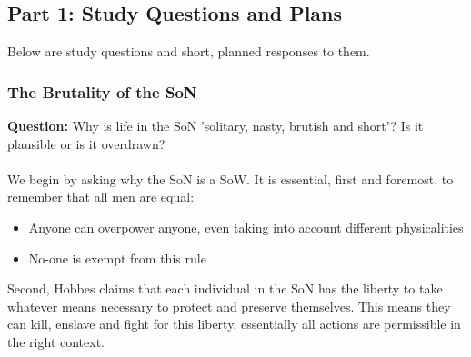 \documentclass[12pt, letterpaper]{article}
\begin{document}
\subsection{Part 1: Study Questions and Plans}
Below are study questions and short, planned responses to them.

\subsubsection{The Brutality of the SoN}
\textbf{Question:} Why is life in the SoN 'solitary, nasty, brutish and short'? Is it plausible or is it overdrawn?\\\\
We begin by asking why the SoN is a SoW. It is essential, first and foremost, to remember that all men are equal:
\begin{itemize}
	\item Anyone can overpower anyone, even taking into account different physicalities
	\item No-one is exempt from this rule
\end{itemize} 
Second, Hobbes claims that each individual in the SoN has the liberty to take whatever means necessary to protect and preserve themselves. This means they can kill, enslave and fight for this liberty, essentially all actions are permissible in the right context.
\end{document}
